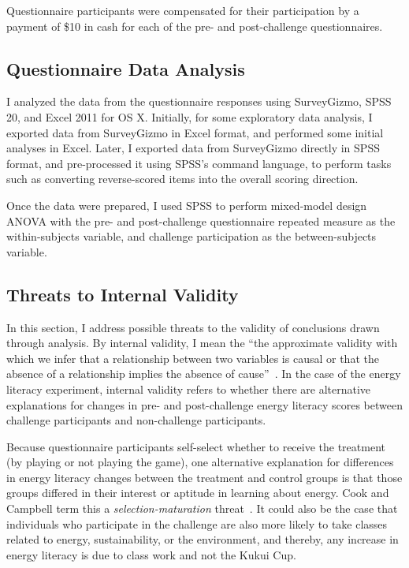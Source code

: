 Questionnaire participants were compensated for their participation by a payment of \$10 in cash for each of the pre- and post-challenge questionnaires.


\subsection{Questionnaire Data Analysis}

I analyzed the data from the questionnaire responses using SurveyGizmo, SPSS 20, and Excel 2011 for OS X. Initially, for some exploratory data analysis, I exported data from SurveyGizmo in Excel format, and performed some initial analyses in Excel. Later, I exported data from SurveyGizmo directly in SPSS format, and pre-processed it using SPSS's command language, to perform tasks such as converting reverse-scored items into the overall scoring direction.

Once the data were prepared, I used SPSS to perform mixed-model design ANOVA  with the pre- and post-challenge questionnaire repeated measure as the within-subjects variable, and challenge participation as the between-subjects variable.


\subsection{Threats to Internal Validity}

In this section, I address possible threats to the validity of conclusions drawn through analysis. By internal validity, I mean the ``the approximate validity with which we infer that a relationship between two variables is causal or that the absence of a relationship implies the absence of cause''~\cite[p. 37]{Cook1979}. In the case of the energy literacy experiment, internal validity refers to whether there are alternative explanations for changes in pre- and post-challenge energy literacy scores between challenge participants and non-challenge participants.

Because questionnaire participants self-select whether to receive the treatment (by playing or not playing the game), one alternative explanation for differences in energy literacy changes between the treatment and control groups is that those groups differed in their interest or aptitude in learning about energy. Cook and Campbell term this a \emph{selection-maturation} threat~\cite[p. 53]{Cook1979}. It could also be the case that individuals who participate in the challenge are also more likely to take classes related to energy, sustainability, or the environment, and thereby, any increase in energy literacy is due to class work and not the Kukui Cup.


